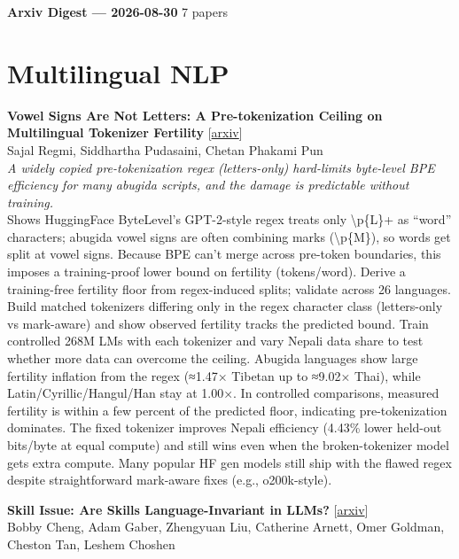 \documentclass[12pt,letterpaper]{article}
\begin{document}
{\footnotesize\textbf{Arxiv Digest --- 2026-08-30} \hfill 7 papers}

\smallskip

\section*{Multilingual NLP}

{\small\textbf{Vowel Signs Are Not Letters: A Pre-tokenization Ceiling on Multilingual Tokenizer Fertility}} {\scriptsize[\href{https://arxiv.org/abs/2608.26449}{arxiv}]}\\
{\scriptsize Sajal Regmi, Siddhartha Pudasaini, Chetan Phakami Pun}\\

{\small\textit{A widely copied pre-tokenization regex (letters-only) hard-limits byte-level BPE efficiency for many abugida scripts, and the damage is predictable without training.}}\\[1pt]
{\footnotesize Shows HuggingFace ByteLevel's GPT-2-style regex treats only \textbackslash{}p\{L\}+ as ``word'' characters; abugida vowel signs are often combining marks (\textbackslash{}p\{M\}), so words get split at vowel signs. Because BPE can't merge across pre-token boundaries, this imposes a training-proof lower bound on fertility (tokens/word). Derive a training-free fertility floor from regex-induced splits; validate across 26 languages. Build matched tokenizers differing only in the regex character class (letters-only vs mark-aware) and show observed fertility tracks the predicted bound. Train controlled 268M LMs with each tokenizer and vary Nepali data share to test whether more data can overcome the ceiling. Abugida languages show large fertility inflation from the regex (≈1.47× Tibetan up to ≈9.02× Thai), while Latin/Cyrillic/Hangul/Han stay at 1.00×. In controlled comparisons, measured fertility is within a few percent of the predicted floor, indicating pre-tokenization dominates. The fixed tokenizer improves Nepali efficiency (4.43\% lower held-out bits/byte at equal compute) and still wins even when the broken-tokenizer model gets extra compute. Many popular HF gen models still ship with the flawed regex despite straightforward mark-aware fixes (e.g., o200k-style).}

\medskip

{\small\textbf{Skill Issue: Are Skills Language-Invariant in LLMs?}} {\scriptsize[\href{https://arxiv.org/abs/2608.25832}{arxiv}]}\\
{\scriptsize Bobby Cheng, Adam Gaber, Zhengyuan Liu, Catherine Arnett, Omer Goldman, Cheston Tan, Leshem Choshen}\\
\end{document}
